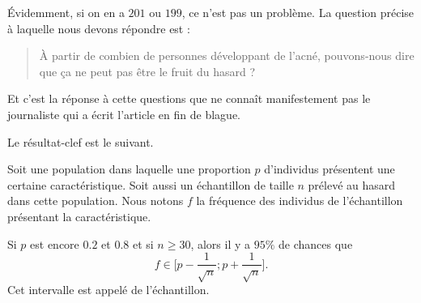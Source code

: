 Évidemment, si on en a \( 201\) ou \( 199\), ce n'est pas un problème. La question précise à laquelle nous devons répondre est :
\begin{quote}
    À partir de combien de personnes développant de l'acné, pouvons-nous dire que ça ne peut pas être le fruit du hasard ?
\end{quote}
Et c'est la réponse à cette questions que ne connaît manifestement pas le journaliste qui a écrit l'article en fin de blague.

Le résultat-clef est le suivant.
\begin{Aretenir}
    Soit une population dans laquelle une proportion \( p\) d'individus présentent une certaine caractéristique. Soit aussi un échantillon de taille \( n\) prélevé au hasard dans cette population. Nous notons \( f\) la fréquence des individus de l'échantillon présentant la caractéristique. 

    Si \( p\) est encore \( 0.2\) et \( 0.8\) et si \( n\geq 30\), alors il y a \( 95\%\) de chances que 
    \begin{equation}
        f\in\mathopen[ p-\frac{1}{ \sqrt{n} } ; p+\frac{1}{ \sqrt{n} } \mathclose].
    \end{equation}
    Cet intervalle est appelé  de l'échantillon.
\end{Aretenir}

